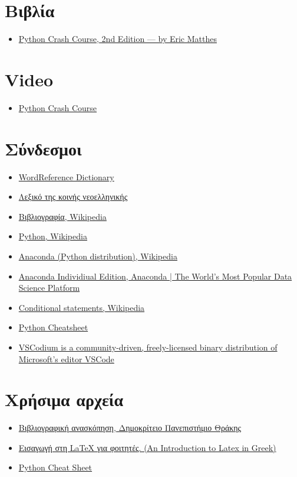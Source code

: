 \documentclass[a4paper,10pt]{report}
\begin{document}
\section{Βιβλία}
\begin{itemize}
    \item \href{https://tinyurl.com/y7l2a48c}{Python Crash Course, 2nd
              Edition — by Eric Matthes}
\end{itemize}
\section{Video}
\begin{itemize}
    \item \href{https://tinyurl.com/ya8wk4xm}{Python Crash Course}
\end{itemize}
\section{Σύνδεσμοι}
\begin{itemize}
    \item \href{https://tinyurl.com/yyzfa2bg}{WordReference Dictionary}
    \item\href{https://tinyurl.com/o5vxal7}{Λεξικό της κοινής νεοελληνικής}
    \item \href{https://tinyurl.com/y9q2elk4}{Βιβλιογραφία, Wikipedia}
    \item \href{https://tinyurl.com/y9g9nkh2}{Python, Wikipedia}
    \item \href{https://tinyurl.com/ycy6jsw5}{Anaconda (Python distribution),
              Wikipedia}
    \item \href{https://tinyurl.com/y7rogsec}{Anaconda Individiual Edition,
              Anaconda | The World's Most Popular Data Science Platform}
    \item \href{https://tinyurl.com/ogoqf2p}{Conditional statements, Wikipedia}
    \item \href{https://tinyurl.com/y8y59y44}{Python Cheatsheet}
    \item \href{https://tinyurl.com/y54gclet}{VSCodium is a community-driven,
              freely-licensed binary distribution of Microsoft’s editor VSCode}
\end{itemize}
\section{Χρήσιμα αρχεία}
\begin{itemize}
    \item \href{https://tinyurl.com/y9l8o5n6}{Βιβλιογραφική ανασκόπηση,
              Δημοκρίτειο Πανεπιστήμιο Θράκης}
    \item \href{https://tinyurl.com/yaaswz5p}{Εισαγωγή στη LaTeX για φοιτητές.
              (An Introduction to Latex in Greek)}
    \item \href{https://tinyurl.com/nqbrvss}{Python Cheat Sheet}
\end{itemize}
\end{document}
